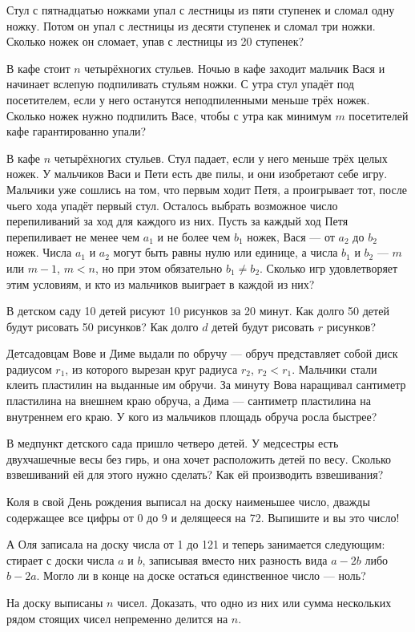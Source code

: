 \begin{itemize}
\itA Стул с пятнадцатью ножками упал с лестницы из пяти ступенек и сломал одну ножку. Потом он упал с лестницы из десяти ступенек и сломал три ножки. Сколько ножек он сломает, упав с лестницы из 20 ступенек?

\itB В кафе стоит $n$ четырёхногих стульев. Ночью в кафе заходит мальчик Вася и начинает вслепую подпиливать стульям ножки. С утра стул упадёт под посетителем, если у него останутся неподпиленными меньше трёх ножек. Сколько ножек нужно подпилить Васе, чтобы с утра как минимум $m$ посетителей кафе гарантированно упали?

\itC В кафе $n$ четырёхногих стульев. Стул падает, если у него меньше трёх целых ножек. У мальчиков Васи и Пети есть две пилы, и они изобретают себе игру. Мальчики уже сошлись на том, что первым ходит Петя, а проигрывает тот, после чьего хода упадёт первый стул. Осталось выбрать возможное число перепиливаний за ход для каждого из них. Пусть за каждый ход Петя перепиливает не менее чем $a_1$ и не более чем $b_1$ ножек, Вася — от $a_2$ до $b_2$ ножек. Числа $a_1$ и $a_2$ могут быть равны нулю или единице, а числа $b_1$ и $b_2$ — $m$ или $m-1$, $m<n$, но при этом обязательно $b_1 \ne b_2$. Сколько игр удовлетворяет этим условиям, и кто из мальчиков выиграет в каждой из них?
\end{itemize}

\begin{itemize}
\itA В детском саду 10 детей рисуют 10 рисунков за 20 минут. Как долго 50 детей будут рисовать 50 рисунков? Как долго $d$ детей будут рисовать $r$ рисунков?

\itB Детсадовцам Вове и Диме выдали по обручу — обруч представляет собой диск радиусом $r_1$, из которого вырезан круг радиуса $r_2$, $r_2<r_1$. Мальчики стали клеить пластилин на выданные им обручи. За минуту Вова наращивал сантиметр пластилина на внешнем краю обруча, а Дима — сантиметр пластилина на внутреннем его краю. У кого из мальчиков площадь обруча росла быстрее?

\itC В медпункт детского сада пришло четверо детей. У медсестры есть двухчашечные весы без гирь, и она хочет расположить детей по весу. Сколько взвешиваний ей для этого нужно сделать? Как ей производить взвешивания?
\end{itemize}

\begin{itemize}
\itA Коля в свой День рождения выписал на доску наименьшее число, дважды содержащее все цифры от 0 до 9 и делящееся на 72. Выпишите и вы это число!

\itB А Оля записала на доску числа от 1 до 121 и теперь занимается следующим: стирает с доски числа $a$ и $b$, записывая вместо них разность вида $a-2b$ либо $b-2a$. Могло ли в конце на доске остаться единственное число — ноль?

\itC На доску выписаны $n$ чисел. Доказать, что одно из них или сумма нескольких рядом стоящих чисел непременно делится на $n$.
\end{itemize}

